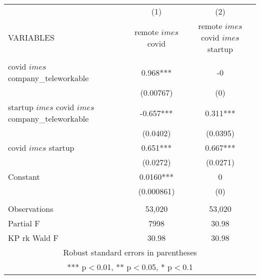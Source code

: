 \begin{tabular}{lcc} \hline
 & (1) & (2) \\
VARIABLES & remote $	imes$ covid & remote $	imes$ covid $	imes$ startup \\ \hline
 &  &  \\
covid $	imes$ company\_teleworkable & 0.968*** & -0 \\
 & (0.00767) & (0) \\
startup $	imes$ covid $	imes$ company\_teleworkable & -0.657*** & 0.311*** \\
 & (0.0402) & (0.0395) \\
covid $	imes$ startup & 0.651*** & 0.667*** \\
 & (0.0272) & (0.0271) \\
Constant & 0.0160*** & 0 \\
 & (0.000861) & (0) \\
 &  &  \\
Observations & 53,020 & 53,020 \\
Partial F & 7998 & 30.98 \\
 KP rk Wald F & 30.98 & 30.98 \\ \hline
\multicolumn{3}{c}{ Robust standard errors in parentheses} \\
\multicolumn{3}{c}{ *** p$<$0.01, ** p$<$0.05, * p$<$0.1} \\
\end{tabular}
